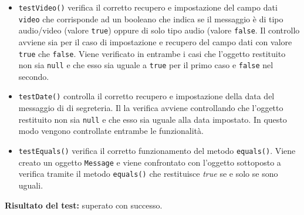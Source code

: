 \begin{itemize}
\begin{itemize}
\item \texttt{testVideo()}  verifica il corretto recupero e impostazione del campo dati \texttt{video} che corrisponde ad un booleano che indica se il messaggio è di tipo audio/video (valore \texttt{true}) oppure di solo tipo audio (valore \texttt{false}.
Il controllo avviene sia per il caso di impostazione e recupero del campo dati con valore 	\texttt{true} che 	\texttt{false}. Viene verificato in entrambe i casi che l'oggetto restituito non sia \texttt{null} e che esso sia uguale a \texttt{true} per il primo caso e \texttt{false} nel secondo.

\item \texttt{testDate()} controlla il corretto recupero e impostazione della data del messaggio di di segreteria.
Il la verifica avviene controllando che l'oggetto restituito non sia \texttt{null} e che esso sia uguale alla data impostato. In questo modo vengono controllate entrambe le funzionalità. 

\item \texttt{testEquals()}
verifica il corretto funzionamento del metodo \texttt{equals()}. Viene creato un oggetto \texttt{Message} e viene confrontato con l'oggetto sottoposto a verifica tramite il metodo \texttt{equals()} che restituisce \textit{true} se e solo se sono uguali.
 
\end{itemize}
\textbf{Risultato del test:} superato con successo.
\end{itemize}

